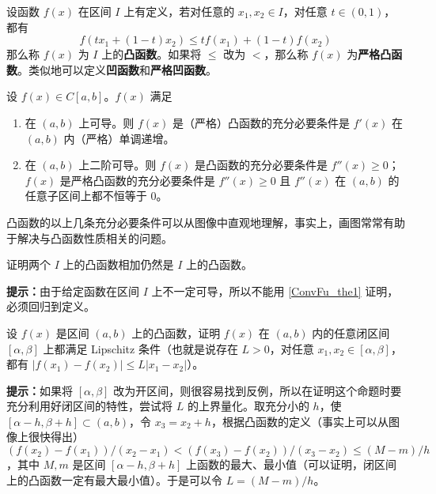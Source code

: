 

设函数 $f(x)$ 在区间 $I$ 上有定义，若对任意的 $x_1,x_2\in I$，对任意 $t\in (0,1)$，都有
\begin{equation}
f(tx_1+(1-t)x_2)\le tf(x_1)+(1-t)f(x_2)
\end{equation}
那么称 $f(x)$ 为 $I$ 上的\textbf{凸函数}。如果将 $\le$ 改为 $<$，那么称 $f(x)$ 为\textbf{严格凸函数}。类似地可以定义\textbf{凹函数}和\textbf{严格凹函数}。
\begin{theorem}{}\label{ConvFu_the1}
设 $f(x)\in C[a,b]$。$f(x)$ 满足
\begin{enumerate}
\item 在 $(a,b)$ 上可导。则 $f(x)$ 是（严格）凸函数的充分必要条件是 $f'(x)$ 在 $(a,b)$ 内（严格）单调递增。
\item 在 $(a,b)$ 上二阶可导。则 $f(x)$ 是凸函数的充分必要条件是 $f''(x)\ge 0$；$f(x)$ 是严格凸函数的充分必要条件是 $f''(x)\ge 0$ 且 $f''(x)$ 在 $(a,b)$ 的任意子区间上都不恒等于 $0$。
\end{enumerate}
\end{theorem}
凸函数的以上几条充分必要条件可以从图像中直观地理解，事实上，画图常常有助于解决与凸函数性质相关的问题。
\begin{exercise}{}
证明两个 $I$ 上的凸函数相加仍然是 $I$ 上的凸函数。

\textbf{提示：}由于给定函数在区间 $I$ 上不一定可导，所以不能用  
\autoref{ConvFu_the1} 证明，必须回归到定义。
\end{exercise}
\begin{exercise}{}
设 $f(x)$ 是区间 $(a,b)$ 上的凸函数，证明 $f(x)$ 在 $(a,b)$ 内的任意闭区间 $[\alpha,\beta]$ 上都满足 Lipschitz 条件（也就是说存在 $L>0$，对任意 $x_1,x_2\in [\alpha,\beta]$，都有 $|f(x_1)-f(x_2)|\le L|x_1-x_2|$）。

\textbf{提示：}如果将 $[\alpha,\beta]$ 改为开区间，则很容易找到反例，所以在证明这个命题时要充分利用好闭区间的特性，尝试将 $L$ 的上界量化。取充分小的 $h$，使 $[\alpha-h,\beta+h]\subset (a,b)$，令 $x_3=x_2+h$，根据凸函数的定义（事实上可以从图像上很快得出）$(f(x_2)-f(x_1))/(x_2-x_1)<(f(x_3)-f(x_2))/(x_3-x_2)\le (M-m)/h$，其中 $M,m$ 是区间 $[\alpha-h,\beta+h]$ 上函数的最大、最小值（可以证明，闭区间上的凸函数一定有最大最小值）。于是可以令 $L=(M-m)/h$。
\end{exercise}

